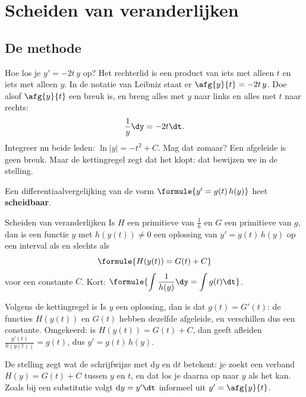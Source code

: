\begin{oefeningen}[Start]

\end{oefeningen}

\section{Scheiden van veranderlijken}

\subsection{De methode}

Hoe los je $y' = -2t\,y$ op? Het rechterlid is een product van iets met alleen $t$ en iets met alleen $y$. In de notatie van Leibniz staat er $\afg{y}{t} = -2t\,y$. Doe alsof $\afg{y}{t}$ een breuk is, en breng alles met $y$ naar links en alles met $t$ naar rechts:
\[
\frac{1}{y}\dy = -2t\dt .
\]
Integreer nu beide leden: $\ln|y| = -t^2 + C$. Mag dat zomaar? Een afgeleide is geen breuk. Maar de kettingregel zegt dat het klopt: dat bewijzen we in de stelling.

\begin{theorie}
Een differentiaalvergelijking van de vorm $\formule{y' = g(t)\, h(y)}$ heet \textbf{\textcolor{accent}{scheidbaar}}.

\begin{stelling}{Scheiden van veranderlijken}
Is $H$ een primitieve van $\tfrac1h$ en $G$ een primitieve van $g$, dan is een functie $y$ met $h(y(t)) \neq 0$ een oplossing van $y' = g(t)\,h(y)$ op een interval als en slechts als
\[
\formule{H(y(t)) = G(t) + C}
\]
voor een constante $C$. Kort: $\formule{\displaystyle\int \frac{1}{h(y)}\dy = \int g(t)\dt}$.
\end{stelling}

\begin{bewijs}
Volgens de kettingregel is
Is $y$ een oplossing, dan is dat $g(t) = G'(t)$: de functies $H(y(t))$ en $G(t)$ hebben dezelfde afgeleide, en verschillen dus een constante. Omgekeerd: is $H(y(t)) = G(t) + C$, dan geeft afleiden $\tfrac{y'(t)}{h(y(t))} = g(t)$, dus $y' = g(t)\,h(y)$.
\end{bewijs}
\end{theorie}

De stelling zegt wat de schrijfwijze met $\mathrm{d}y$ en $\mathrm{d}t$ betekent: je zoekt een verband $H(y) = G(t) + C$ tussen $y$ en $t$, en dat los je daarna op naar $y$ als het kan. Zoals bij een substitutie volgt $\mathrm{d}y = y'\dt$ informeel uit $y' = \afg{y}{t}$.

